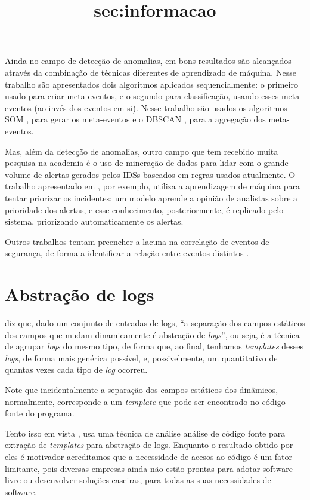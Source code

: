 \documentclass[
	12pt,				%
	openright,			%
	twoside,			%
	a4paper,			%
	english,			%
	french,				%
	spanish,			%
	brazil,				%
	]{abntex2}
\begin{document}
Ainda no campo de detecção de anomalias, em \cite{li2013automatic} bons resultados são alcançados através da combinação de técnicas diferentes de aprendizado de máquina. Nesse trabalho são apresentados dois algoritmos aplicados sequencialmente: o primeiro usado para criar meta-eventos, e o segundo para classificação, usando esses meta-eventos (ao invés dos eventos em si). Nesse trabalho são usados os algoritmos SOM \cite{kohonen1989self}, para gerar os meta-eventos e o DBSCAN \cite{ester1996density}, para a agregação dos meta-eventos.

Mas, além da detecção de anomalias, outro campo que tem recebido muita pesquisa na academia é o uso de mineração de dados para lidar com o grande volume de alertas gerados pelos IDSs baseados em regras usados atualmente. O trabalho apresentado em \cite{zomlot2013aiding}, por exemplo, utiliza a aprendizagem de máquina para tentar priorizar os incidentes: um modelo aprende a opinião de analistas sobre a prioridade dos alertas, e esse conhecimento, posteriormente, é replicado pelo sistema, priorizando automaticamente os alertas.

Outros trabalhos tentam preencher a lacuna na correlação de eventos de segurança, de forma a identificar a relação entre eventos distintos \cite{smith2008using, stroeh2013approach}.

\section{Abstração de logs}\title{sec:informacao}
\cite{nagappan2010abstracting} diz que, dado um conjunto de entradas de logs, ``a separação dos campos estáticos dos campos que mudam dinamicamente é abstração de \emph{logs}'', ou seja, é a técnica de agrupar \emph{logs} do mesmo tipo, de forma que, ao final, tenhamos \emph{templates} desses \emph{logs}, de forma mais genérica possível, e, possivelmente, um quantitativo de quantas vezes cada tipo de \emph{log} ocorreu.

Note que incidentalmente a separação dos campos estáticos dos dinâmicos, normalmente, corresponde a um \emph{template} que pode ser encontrado no código fonte do programa. 

Tento isso em vista \cite{xu2009detecting}, usa uma técnica de análise análise de código fonte para extração de \emph{templates} para abstração de logs. Enquanto o resultado obtido por eles é motivador acreditamos que a necessidade de acesos ao código é um fator limitante, pois diversas empresas ainda não estão prontas para adotar software livre ou desenvolver soluções caseiras, para todas as suas necessidades de software.
\end{document}
